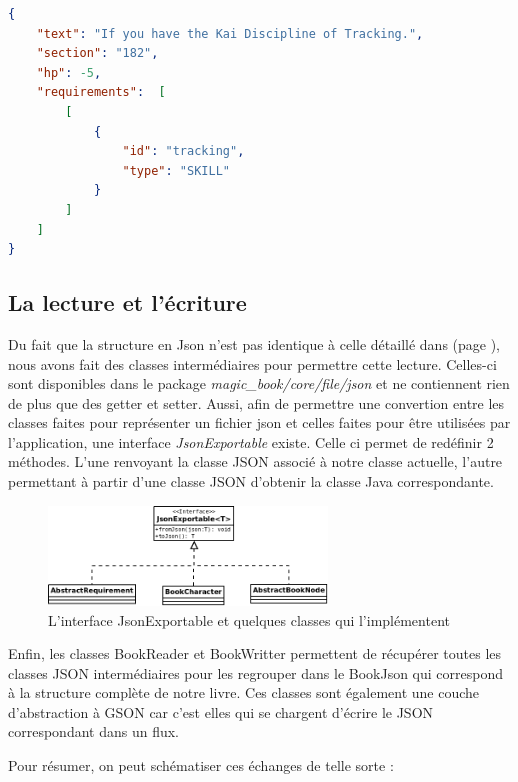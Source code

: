 \begin{lstlisting}[language=json, caption=Exemple de choix]
{
	"text": "If you have the Kai Discipline of Tracking.",
	"section": "182",
	"hp": -5,
	"requirements":  [
		[
			{
				"id": "tracking",
				"type": "SKILL"
			}
		]
	]
}
\end{lstlisting}

		\subsection{La lecture et l'écriture}
			\label{subsec:lecture_ecriture_fichier}

			Du fait que la structure en Json n'est pas identique à celle détaillé dans  (page \pageref{sec:representation_livre}), nous avons fait des classes intermédiaires pour permettre cette lecture. Celles-ci sont disponibles dans le package \textit{magic\_book/core/file/json} et ne contiennent rien de plus que des getter et setter. Aussi, afin de permettre une convertion entre les classes faites pour représenter un fichier json et celles faites pour être utilisées par l'application, une interface \textit{JsonExportable} existe. Celle ci permet de redéfinir 2 méthodes. L'une renvoyant la classe JSON associé à notre classe actuelle, l'autre permettant à partir d'une classe JSON d'obtenir la classe Java correspondante.

			\begin{figure}[H]
				\centering\includegraphics[width=0.66\textwidth, keepaspectratio]{img/json_exportable.png}
				\caption{L'interface JsonExportable et quelques classes qui l'implémentent}
			\end{figure}

			Enfin, les classes BookReader et BookWritter permettent de récupérer toutes les classes JSON intermédiaires pour les regrouper dans le BookJson qui correspond à la structure complète de notre livre. Ces classes sont également une couche d'abstraction à GSON car c'est elles qui se chargent d'écrire le JSON correspondant dans un flux.

			Pour résumer, on peut schématiser ces échanges de telle sorte :

